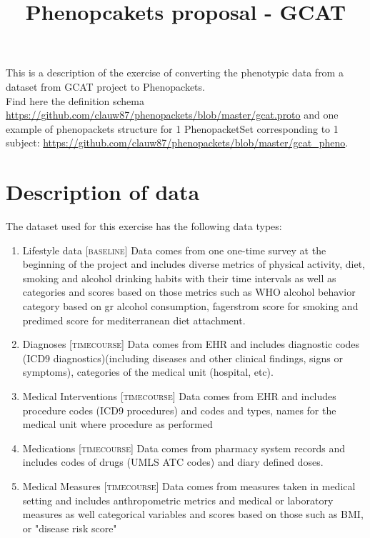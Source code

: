 \documentclass[a4paper, 10pt]{article}
\title{Phenopcakets proposal - GCAT}
\begin{document}
\date{}
\maketitle




This is a description of the exercise of converting the phenotypic data from a dataset from GCAT project to Phenopackets. \\

Find here the definition schema \url{https://github.com/clauw87/phenopackets/blob/master/gcat.proto} and one example of phenopackets structure for 1 PhenopacketSet corresponding to 1 subject: \url{https://github.com/clauw87/phenopackets/blob/master/gcat\_pheno}.


\section{Description of data}


The dataset used for this exercise has the following data types:
\begin{enumerate}
\item{Lifestyle data} \textsc{[baseline]} Data comes from one one-time survey at the beginning of the project and includes diverse metrics of physical activity, diet, smoking and alcohol drinking habits with their time intervals as well as categories and scores based on those metrics such as WHO alcohol behavior category based on gr alcohol consumption, fagerstrom score for smoking and predimed score for mediterranean diet attachment.

\item{Diagnoses} \textsc{[timecourse]} Data comes from EHR and includes diagnostic codes (ICD9 diagnostics)(including diseases and other clinical findings, signs or symptoms), categories of the medical unit (hospital, etc).

\item{Medical Interventions} \textsc{[timecourse]} Data comes from EHR and includes procedure codes (ICD9 procedures) and codes and types, names for the medical unit where procedure as performed

 \item{Medications} \textsc{[timecourse]} Data comes from pharmacy system records and includes codes of drugs (UMLS ATC codes) and diary defined doses.
 
 \item{Medical Measures} \textsc{[timecourse]} Data comes from measures taken in medical setting and includes anthropometric metrics and medical or laboratory measures as well categorical variables and scores based on those such as BMI, or "disease risk score"
\end{enumerate}
\end{document}
